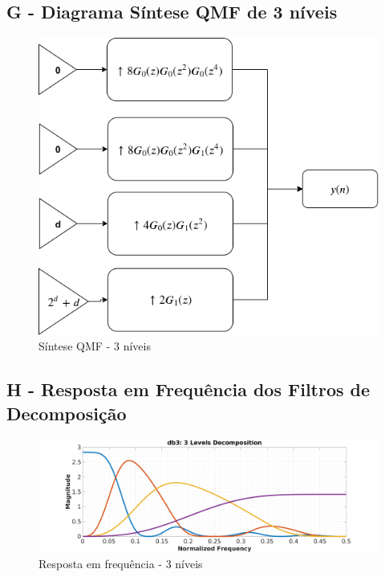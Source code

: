 \documentclass{article}
\begin{document}
\subsection*{G - Diagrama Síntese QMF de 3 níveis}

\begin{figure}[H]
	\begin{center}
		\includegraphics[scale=0.35]{Figures/rec_3.png}
		\caption{Síntese QMF - 3 níveis}
		\label{fig:Q1_rec}
	\end{center}
\end{figure}

\subsection*{H - Resposta em Frequência dos Filtros de Decomposição}

\begin{figure}[H]
	\begin{center}
		\includegraphics[scale=0.25]{../Q1_db3-3levels.png}
		\caption{Resposta em frequência - 3 níveis}
		\label{fig:Q1_db3_3}
	\end{center}
\end{figure}
\end{document}
